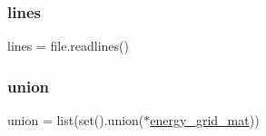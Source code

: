 \subsubsection{\texorpdfstring{lines}{lines}}
{\footnotesize\ttfamily lines = file.\+readlines()}

\mbox{\label{namespaceread__energ__grid_a10bb6c727adacd7b9a838b08c7e738cc}} 
\subsubsection{\texorpdfstring{union}{union}}
{\footnotesize\ttfamily union = list(set().union($\ast$\mbox{\hyperlink{namespaceread__energ__grid_a94a3bb867ec79a84675f563f698debbf}{energy\+\_\+grid\+\_\+mat}}))}

